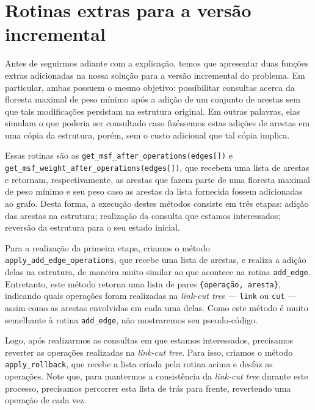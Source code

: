 \section{Rotinas extras para a versão incremental}
\label{sec:rmsf-extras}

Antes de seguirmos adiante com a explicação, temos que apresentar duas funções extras adicionadas na nossa solução para a versão incremental do problema. Em particular, ambas possuem o mesmo objetivo: possibilitar consultas acerca da floresta maximal de peso mínimo após a adição de um conjunto de arestas sem que tais modificações persistam na estrutura original. Em outras palavras, elas simulam o que poderia ser consultado caso fizéssemos estas adições de arestas em uma cópia da estrutura, porém, sem o custo adicional que tal cópia implica.

Essas rotinas são as \texttt{get\_msf\_after\_operations(edges[])} e \texttt{get\_msf\_weight\_after\_operations(edges[])}, que recebem uma lista de arestas e retornam, respectivamente, as arestas que fazem parte de uma floresta maximal de peso mínimo e seu peso caso as arestas da lista fornecida fossem adicionadas ao grafo. Desta forma, a execução destes métodos consiste em três etapas: adição das arestas na estrutura; realização da consulta que estamos interessados; reversão da estrutura para o seu estado inicial.

Para a realização da primeira etapa, criamos o método \texttt{apply\_add\_edge\_operations}, que recebe uma lista de arestas, e realiza a adição delas na estrutura, de maneira muito similar ao que acontece na rotina \texttt{add\_edge}. Entretanto, este método retorna uma lista de pares \texttt{\{operação, aresta\}}, indicando quais operações foram realizadas na \emph{link-cut tree} --- \texttt{link} ou \texttt{cut} --- assim como as arestas envolvidas em cada uma delas. Como este método é muito semelhante à rotina \texttt{add\_edge}, não mostraremos seu pseudo-código.

Logo, após realizarmos as consultas em que estamos interessados, precisamos reverter as operações realizadas na \emph{link-cut tree}. Para isso, criamos o método \texttt{apply\_rollback}, que recebe a lista criada pela rotina acima e desfaz as operações. Note que, para mantermos a consistência da \emph{link-cut tree} durante este processo, precisamos percorrer esta lista de trás para frente, revertendo uma operação de cada vez.


